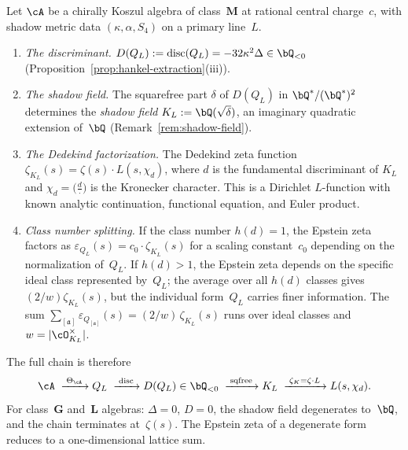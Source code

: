 \begin{construction}
\label{constr:shadow-l-function}
Let $\cA$ be a chirally Koszul algebra of class~$\mathbf{M}$
at rational central charge~$c$, with shadow metric data
$(\kappa, \alpha, S_4)$ on a primary line~$L$.
\begin{enumerate}[label=\textup{(\roman*)}]
\item
\emph{The discriminant.}
$D(Q_L) := \operatorname{disc}(Q_L) = -32\kappa^2\Delta
\in \bQ_{<0}$
\textup{(}Proposition~\textup{\ref{prop:hankel-extraction}(iii)}\textup{)}.

\item
\emph{The shadow field.}
The squarefree part $\delta$ of $D(Q_L)$ in $\bQ^*/(\bQ^*)^2$
determines the \emph{shadow field}
$K_L := \bQ(\sqrt{\delta})$,
an imaginary quadratic extension of~$\bQ$
\textup{(}Remark~\textup{\ref{rem:shadow-field}}\textup{)}.

\item
\emph{The Dedekind factorization.}
The Dedekind zeta function $\zeta_{K_L}(s) = \zeta(s) \cdot
L(s, \chi_d)$, where $d$ is the fundamental discriminant of
$K_L$ and $\chi_d = \bigl(\tfrac{d}{\cdot}\bigr)$ is the
Kronecker character. This is a Dirichlet $L$-function with known
analytic continuation, functional equation, and Euler product.

\item
\emph{Class number splitting.}
If the class number $h(d) = 1$, the Epstein zeta factors as
$\varepsilon_{Q_L}(s) = c_0 \cdot \zeta_{K_L}(s)$ for a scaling
constant~$c_0$ depending on the normalization of~$Q_L$.
If $h(d) > 1$, the Epstein zeta depends on the specific ideal
class represented by~$Q_L$; the average over all $h(d)$ classes
gives $(2/w)\zeta_{K_L}(s)$, but the individual
form~$Q_L$ carries finer information.
The sum
$\sum_{[\mathfrak{a}]}
\varepsilon_{Q_{[\mathfrak{a}]}}(s)
= (2/w)\,\zeta_{K_L}(s)$
runs over ideal classes and $w = |\cO_{K_L}^\times|$.
\end{enumerate}
The full chain is therefore
\[
 \cA
 \;\xrightarrow{\;\Theta_\cA\;}
 Q_L
 \;\xrightarrow{\;\operatorname{disc}\;}
 D(Q_L) \in \bQ_{<0}
 \;\xrightarrow{\;\mathrm{sqfree}\;}
 K_L
 \;\xrightarrow{\;\zeta_K = \zeta \cdot L\;}
 L(s, \chi_d).
\]
For class~$\mathbf{G}$ and~$\mathbf{L}$ algebras: $\Delta = 0$,
$D = 0$, the shadow field degenerates to~$\bQ$, and the chain
terminates at~$\zeta(s)$.
The Epstein zeta of a degenerate form reduces to a
one-dimensional lattice sum.
\end{construction}

